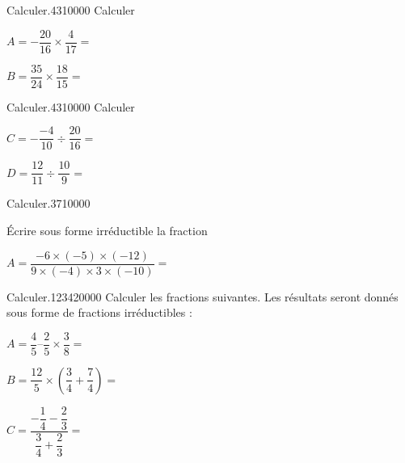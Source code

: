
\begin{pageParcoursu} %




\begin{minipage}{0.5\linewidth}
\begin{ExoCuN}{Calculer.}{43}{1}{0}{0}{0}{0}
Calculer \vspace{0.4cm}

$A=-\dfrac{20}{16} \times \dfrac{4}{17}=$

$B=\dfrac{35}{24} \times \dfrac{18}{15}=$
\end{ExoCuN}
\end{minipage}
\begin{minipage}{0.5\linewidth}
\begin{ExoCuN}{Calculer.}{43}{1}{0}{0}{0}{0}
Calculer \vspace{0.4cm}

$C=-\dfrac{-4}{10} \div \dfrac{20}{16}=$

$D=\dfrac{12}{11} \div \dfrac{10}{9}=$


\end{ExoCuN}
\end{minipage}


\begin{ExoCuN}{Calculer.}{37}{1}{0}{0}{0}{0}

Écrire sous forme irréductible la fraction 

$A=\dfrac{-6 \times ( -5) \times (-12)}{9 \times ( -4) \times 3 \times (-10)}=$

\end{ExoCuN}



\begin{ExoCu}{Calculer.}{1234}{2}{0}{0}{0}{0}
Calculer les fractions suivantes. Les résultats seront donnés sous forme de fractions irréductibles : \vspace{0.4cm}

$A=\dfrac{4}{5} – \dfrac{2}{5} \times \dfrac{3}{8}=$ 

$B = \dfrac{12}{5} \times \left(\dfrac{3}{4} + \dfrac{7}{4} \right)=$ 

$C = \dfrac{-\dfrac{1}{4} -\dfrac{2}{3}}{\dfrac{3}{4}+\dfrac{2}{3}}=$ 
\end{ExoCu}



\end{pageParcoursu}
